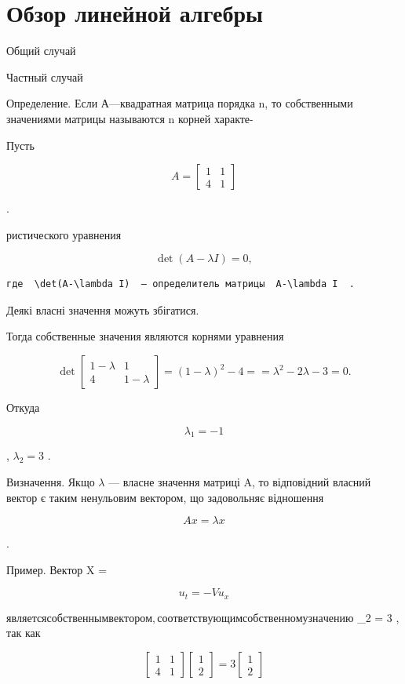 \documentclass[
  ukrainian,
]{article}
\begin{document}
\section{Обзор линейной
алгебры}\label{ux43eux431ux437ux43eux440-ux43bux438ux43dux435ux439ux43dux43eux439-ux430ux43bux433ux435ux431ux440ux44b}

Общий случай

Частный случай

Определение. Если А---квадратная матрица порядка n, то собственными
значениями матрицы называются n корней характе-

Пусть

\[
A =
\begin{bmatrix} 1 & 1 \\ 4 & 1 \end{bmatrix}
\]

.

ристического уравнения

\[
\det\left(A-\lambda I\right)=0,
\]

\begin{verbatim}
где  \det(A-\lambda I)  — определитель матрицы  A-\lambda I  .
\end{verbatim}

Деякі власні значення можуть збігатися.

Тогда собственные значения являются корнями уравнения

\[
\det
\begin{bmatrix} 1-\lambda & 1\\ 4 & 1-\lambda \end{bmatrix}
= (1-\lambda)^2 - 4 =
= \lambda^2 - 2\lambda - 3 = 0.
\]

Откуда

\[
\lambda_1 = -1
\]

, \(\lambda_2 = 3\) .

Визначення. Якщо \(\lambda\) --- власне значення матриці A, то
відповідний власний вектор є таким ненульовим вектором, що задовольняє
відношення

\[
Ax = \lambda x
\]

.

Пример. Вектор X =

\[
u_t = -Vu_x
\]

\(является собственным вектором, соответствующим собственному значению\)
\lambda\_2 = 3 , так как

\[
\begin{bmatrix} 1 & 1 \\ 4 & 1 \end{bmatrix}
\begin{bmatrix} 1 \\ 2 \end{bmatrix}
= 3
\begin{bmatrix} 1 \\ 2 \end{bmatrix}
\]
\end{document}
